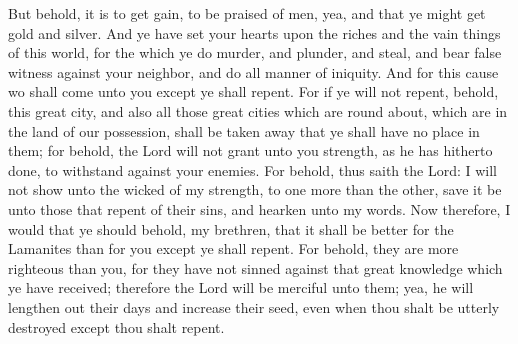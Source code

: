 But behold, it is to get gain, to be praised of men, yea, and that ye might get gold and silver. And ye have set your hearts upon the riches and the vain things of this world, for the which ye do murder, and plunder, and steal, and bear false witness against your neighbor, and do all manner of iniquity.
\bverse \iffalse And for this cause wo shall come unto you except ye shall repent. For if ye will not repent, behold, this great city, and also all those great cities which are round about, which are in the land of our possession, shall be taken away that ye shall have no place in them; for behold, the Lord will not grant unto you strength, as he has hitherto done, to withstand against your enemies. \fi
And for this cause wo shall come unto you except ye shall repent. For if ye will not repent, behold, this great city, and also all those great cities which are round about, which are in the land of our possession, shall be taken away that ye shall have no place in them; for behold, the Lord will not grant unto you strength, as he has hitherto done, to withstand against your enemies.
\bverse \iffalse For behold, thus saith the Lord: I will not show unto the wicked of my strength, to one more than the other, save it be unto those that repent of their sins, and hearken unto my words.  Now therefore, I would that ye should behold, my brethren, that it shall be better for the Lamanites than for you except ye shall repent. \fi
For behold, thus saith the Lord: I will not show unto the wicked of my strength, to one more than the other, save it be unto those that repent of their sins, and hearken unto my words.  Now therefore, I would that ye should behold, my brethren, that it shall be better for the Lamanites than for you except ye shall repent.
\bverse \iffalse For behold, they are more righteous than you, for they have not sinned against that great knowledge which ye have received; therefore the Lord will be merciful unto them; yea, he will lengthen out their days and increase their seed, even when thou shalt be utterly destroyed except thou shalt repent. \fi
For behold, they are more righteous than you, for they have not sinned against that great knowledge which ye have received; therefore the Lord will be merciful unto them; yea, he will lengthen out their days and increase their seed, even when thou shalt be utterly destroyed except thou shalt repent.
\bverse \iffalse Yea, wo be unto you because of that great abomination which has come among you; and ye have united yourselves unto it, yea, to that secret band which was established by Gadianton! \fi
